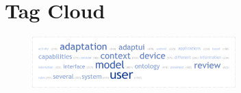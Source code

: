 \ifpdf
    \graphicspath{{0_frontmatter/figures/PNG/}{0_frontmatter/figures/PDF/}{0_frontmatter/figures/}}
\else
    \graphicspath{{0_frontmatter/figures/EPS/}{0_frontmatter/figures/}}
\fi

\chapter*{Tag Cloud}

\begin{figure}[H]
\centering
\includegraphics[width=0.70\textwidth]{tagcloud.pdf}
\label{fig:tagcloud}
\end{figure}